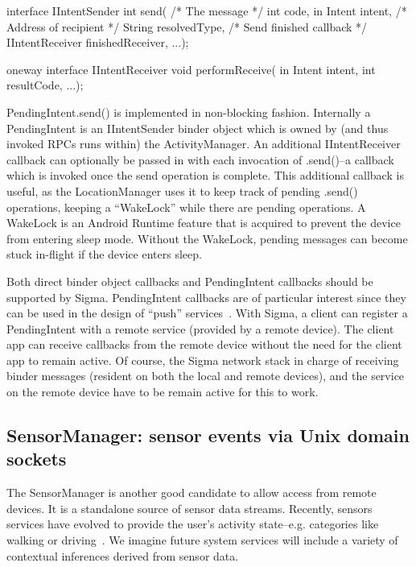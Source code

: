 \documentclass[prodmode]{acmlarge}
\begin{document}
\begin{snippet}
interface IIntentSender {
  int send(
    /* The message */
    int code, in Intent intent,
    /* Address of recipient */
    String resolvedType,
    /* Send finished callback */
    IIntentReceiver finishedReceiver,
    ...);
}
\end{snippet}

\begin{snippet}
oneway interface IIntentReceiver {
  void performReceive(
      in Intent intent, int resultCode,
      ...);
}
\end{snippet}

PendingIntent.send() is implemented in non-blocking fashion. Internally a PendingIntent is an IIntentSender binder object which is owned by (and thus invoked RPCs runs within) the ActivityManager. An additional IIntentReceiver callback can optionally be passed in with each invocation of .send()--a callback which is invoked once the send operation is complete. This additional callback is useful, as the LocationManager uses it to keep track of pending .send() operations, keeping a ``WakeLock'' while there are pending operations. A WakeLock is an Android Runtime feature that is acquired to prevent the device from entering sleep mode. Without the WakeLock, pending messages can become stuck in-flight if the device enters sleep.

Both direct binder object callbacks and PendingIntent callbacks should be supported by Sigma. PendingIntent callbacks are of particular interest since they can be used in the design of ``push'' services~\cite{PushTechnology}. With Sigma, a client can register a PendingIntent with a remote service (provided by a remote device). The client app can receive callbacks from the remote device without the need for the client app to remain active. Of course, the Sigma network stack in charge of receiving binder messages (resident on both the local and remote devices), and the service on the remote device have to be remain active for this to work.

\subsection{SensorManager: sensor events via Unix domain sockets}
The SensorManager is another good candidate to allow access from remote devices. It is a standalone source of sensor data streams. Recently, sensors services have evolved to provide the user's activity state--e.g. categories like walking or driving~\cite{AndroidActivityRecognition}. We imagine future system services will include a variety of contextual inferences derived from sensor data.
\end{document}
